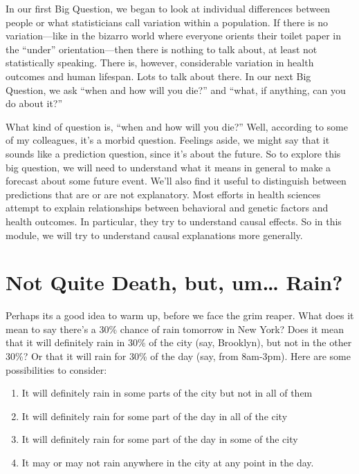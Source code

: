 \documentclass[]{book}
\providecommand{\tightlist}{%
  \setlength{\itemsep}{0pt}\setlength{\parskip}{0pt}}
\begin{document}
In our first Big Question, we began to look at individual differences between people or what statisticians call variation within a population. If there is no variation---like in the bizarro world where everyone orients their toilet paper in the ``under'' orientation---then there is nothing to talk about, at least not statistically speaking. There is, however, considerable variation in health outcomes and human lifespan. Lots to talk about there. In our next Big Question, we ask ``when and how will you die?'' and ``what, if anything, can you do about it?''

What kind of question is, ``when and how will you die?'' Well, according to some of my colleagues, it's a morbid question. Feelings aside, we might say that it sounds like a prediction question, since it's about the future. So to explore this big question, we will need to understand what it means in general to make a forecast about some future event. We'll also find it useful to distinguish between predictions that are or are not explanatory. Most efforts in health sciences attempt to explain relationships between behavioral and genetic factors and health outcomes. In particular, they try to understand causal effects. So in this module, we will try to understand causal explanations more generally.

\hypertarget{not-quite-death-but-um-rain}{%
\section{Not Quite Death, but, um\ldots{} Rain?}\label{not-quite-death-but-um-rain}}

Perhaps its a good idea to warm up, before we face the grim reaper. What does it mean to say there's a 30\% chance of rain tomorrow in New York? Does it mean that it will definitely rain in 30\% of the city (say, Brooklyn), but not in the other 30\%? Or that it will rain for 30\% of the day (say, from 8am-3pm). Here are some possibilities to consider:

\begin{enumerate}
\def\labelenumi{\alph{enumi})}
\tightlist
\item
  It will definitely rain in some parts of the city but not in all of them
\item
  It will definitely rain for some part of the day in all of the city
\item
  It will definitely rain for some part of the day in some of the city
\item
  It may or may not rain anywhere in the city at any point in the day.
\end{enumerate}
\end{document}
